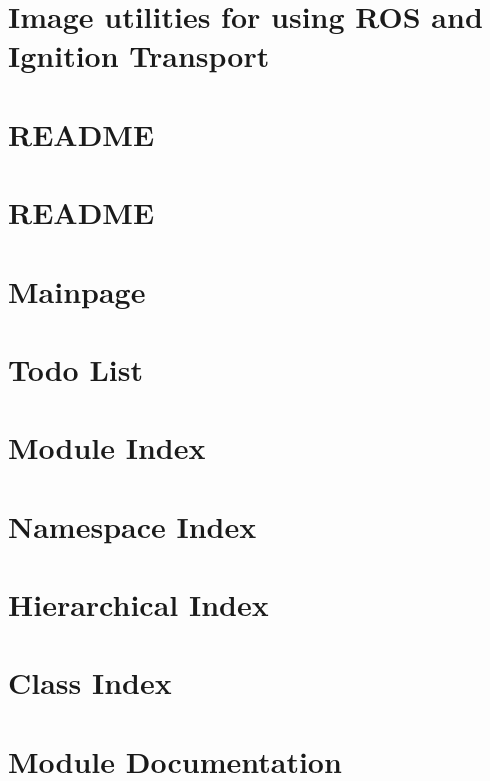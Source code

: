\let\mypdfximage\pdfximage\def\pdfximage{\immediate\mypdfximage}\documentclass[twoside]{book}
\newcommand{\+}{\discretionary{\mbox{\scriptsize$\hookleftarrow$}}{}{}}
\begin{document}
\chapter{Image utilities for using R\+OS and Ignition Transport}
\label{md_catkin_ws_src_utilities_ros_ign_ros_ign_image_README}

\chapter{R\+E\+A\+D\+ME}
\label{md_catkin_ws_src_utilities_ros_ign_ros_ign_point_cloud_README}

\chapter{R\+E\+A\+D\+ME}
\label{md_catkin_ws_src_utilities_Serial_CAN_Arduino_README}

\chapter{Mainpage}
\label{md_docs_markdown_mainpage}

\chapter{Todo List}
\label{todo}

\chapter{Module Index}

\chapter{Namespace Index}

\chapter{Hierarchical Index}

\chapter{Class Index}

\chapter{Module Documentation}





\end{document}
